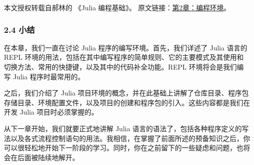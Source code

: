 
本文授权转载自郝林的 《Julia 编程基础》。 原文链接：\href{https://github.com/hyper0x/JuliaBasics/blob/master/book/ch02.md}{第2章：编程环境}。

\subsubsection{2.4 小结}

在本章，我们一直在讨论 Julia 程序的编写环境。首先，我们详述了 Julia 语言的 REPL 环境的用法，包括在其中编写程序的简单规则、它的主要模式及其使用和切换方法、常用的快捷键，以及其中的代码补全功能。REPL 环境将会是我们编写 Julia 程序时最常用的。

之后，我们介绍了 Julia 项目环境的概念，并在此基础上讲解了仓库目录、程序包存储目录、环境配置文件，以及项目的创建和程序包的引入。这些内容都是我们在开发 Julia 项目时必须掌握的。

从下一章开始，我们就要正式地讲解 Julia 语言的语法了，包括各种程序定义的写法以及各式流程控制语句的用法。我相信，在掌握了前面所述的预备知识之后，你可以很轻松地开始下一阶段的学习。同时，你在之前留下的一些疑虑和问题，也将会在后面被陆续地解开。
